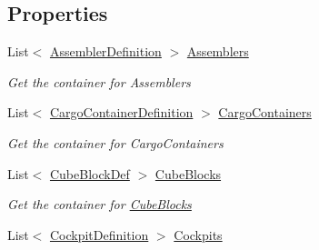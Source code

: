 \subsection*{Properties}
\begin{DoxyCompactItemize}
\item 
List$<$ \hyperlink{class_s_e_mod_a_p_i_1_1_a_p_i_1_1_definitions_1_1_cube_blocks_1_1_assembler_definition}{Assembler\+Definition} $>$ \hyperlink{class_s_e_mod_a_p_i_1_1_a_p_i_1_1_definitions_1_1_cube_blocks_1_1_blocks_manager_a38cbf7a68db6c04e4e31d8943473eb84}{Assemblers}
\begin{DoxyCompactList}\small\item\em Get the container for Assemblers \end{DoxyCompactList}\item 
List$<$ \hyperlink{class_s_e_mod_a_p_i_1_1_a_p_i_1_1_definitions_1_1_cube_blocks_1_1_cargo_container_definition}{Cargo\+Container\+Definition} $>$ \hyperlink{class_s_e_mod_a_p_i_1_1_a_p_i_1_1_definitions_1_1_cube_blocks_1_1_blocks_manager_a7ce2ba39cf651041bd3b2cc4d44b6e30}{Cargo\+Containers}
\begin{DoxyCompactList}\small\item\em Get the container for Cargo\+Containers \end{DoxyCompactList}\item 
List$<$ \hyperlink{class_s_e_mod_a_p_i_1_1_a_p_i_1_1_definitions_1_1_cube_blocks_1_1_cube_block_def}{Cube\+Block\+Def} $>$ \hyperlink{class_s_e_mod_a_p_i_1_1_a_p_i_1_1_definitions_1_1_cube_blocks_1_1_blocks_manager_a8a488e6460551bd6811a6a692a7fafdc}{Cube\+Blocks}
\begin{DoxyCompactList}\small\item\em Get the container for \hyperlink{namespace_s_e_mod_a_p_i_1_1_a_p_i_1_1_definitions_1_1_cube_blocks}{Cube\+Blocks} \end{DoxyCompactList}\item 
List$<$ \hyperlink{class_s_e_mod_a_p_i_1_1_a_p_i_1_1_definitions_1_1_cube_blocks_1_1_cockpit_definition}{Cockpit\+Definition} $>$ \hyperlink{class_s_e_mod_a_p_i_1_1_a_p_i_1_1_definitions_1_1_cube_blocks_1_1_blocks_manager_aedb1484d75c6466d30107e4eb49468a9}{Cockpits}

\end{DoxyCompactItemize}
